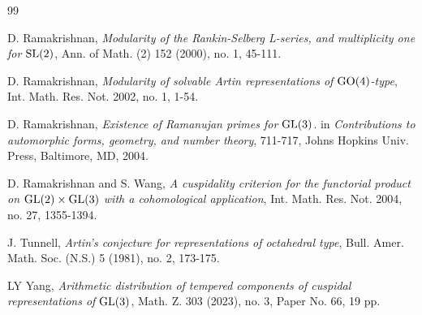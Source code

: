 \documentclass[11pt]{amsart}
\theoremstyle{plain}
\numberwithin{equation}{section}
\def\SL{{\rm SL}}
\def\GL{{\rm GL}}
\begin{document}
\begin{thebibliography}{99}







 D. Ramakrishnan, {\em Modularity of the Rankin-Selberg L-series, and multiplicity one for $\SL(2)$},  Ann. of Math. (2) 152 (2000), no. 1, 45-111.


 D. Ramakrishnan, {\em Modularity of solvable Artin representations of ${\rm GO}(4)$-type},  Int. Math. Res. Not. 2002, no. 1, 1-54.

 D. Ramakrishnan, {\em Existence of Ramanujan primes for $\GL(3)$}. in {\em  Contributions to automorphic forms, geometry, and number theory},  711-717, Johns Hopkins Univ. Press, Baltimore, MD, 2004. 

 D. Ramakrishnan and S. Wang, {\em A cuspidality criterion for the functorial product on $\GL(2) \times \GL(3)$ with a cohomological application}, Int. Math. Res. Not. 2004, no. 27, 1355-1394.

 J. Tunnell, {\em Artin's conjecture for representations of octahedral type}, Bull. Amer. Math. Soc. (N.S.) 5 (1981), no. 2, 173-175.

 LY Yang, {\em Arithmetic distribution of tempered components of cuspidal representations of $\GL(3)$},  Math. Z. 303 (2023), no. 3, Paper No. 66, 19 pp.



\end{thebibliography}
\end{document}
